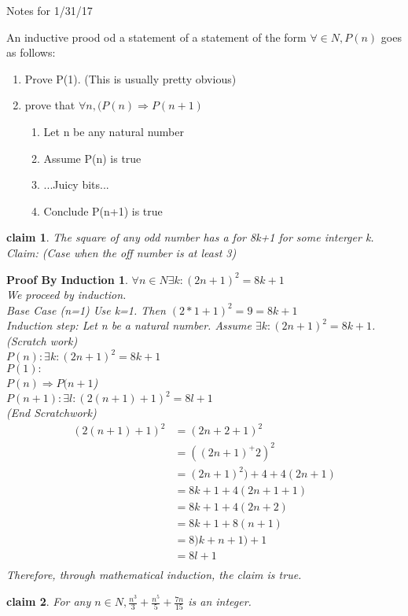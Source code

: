 \documentclass{article}
\begin{document}
\newtheorem{PBI}{Proof By Induction}
\newtheorem{claim*}{claim}
\begin{center}
Notes for 1/31/17
\end{center}

An inductive prood od a statement of a statement of the form $\forall \in N, P(n)$ goes as follows:
\begin{enumerate}
\item Prove P(1). (This is usually pretty obvious)
\item prove that $\forall n,(P(n) \Rightarrow P(n+1)$
\begin{enumerate}
\item Let n be any natural number
\item Assume P(n) is true
\item ...Juicy bits...
\item Conclude P(n+1) is true
\end{enumerate}
\end{enumerate}
\begin{claim*}
The square of any odd number has a for 8k+1 for some interger k.\\
Claim: (Case when the off number is at least 3)\\
\end{claim*}
\begin{PBI}
$\forall n \in N \exists k:(2n+1)^2=8k+1$ \\
We proceed by induction.\\
Base Case (n=1) Use k=1. Then $(2*1+1)^2=9=8k+1$ \\
Induction step: Let n be a natural number. Assume $\exists k:(2n+1)^2=8k+1$.\\
(Scratch work)\\
$P(n): \exists k: (2n+1)^2=8k+1$\\
$P(1):$ \\
$P(n) \Rightarrow P(n+1$) \\
$P(n+1): \exists l: (2(n+1)+1)^2=8l+1$ \\
(End Scratchwork)\\
\begin{align*}
(2(n+1)+1)^2 &= (2n+2+1)^2 \\
&=((2n+1)^+2)^2 \\
&=(2n+1)^2)+4+4(2n+1)\\
&=8k+1+4(2n+1+1)\\
&=8k+1+4(2n+2) \\
&=8k+1+8(n+1) \\
&=8)k+n+1)+1 \\
&=8l+1 \\
\end{align*}
Therefore, through mathematical induction, the claim is true. \\
\end{PBI}
\begin{claim*}
For any $n \in N, \frac{n^3}{3}+\frac{n^5}{5}+\frac{7n}{15}$ is an integer.\\

\end{claim*}
\end{document}
